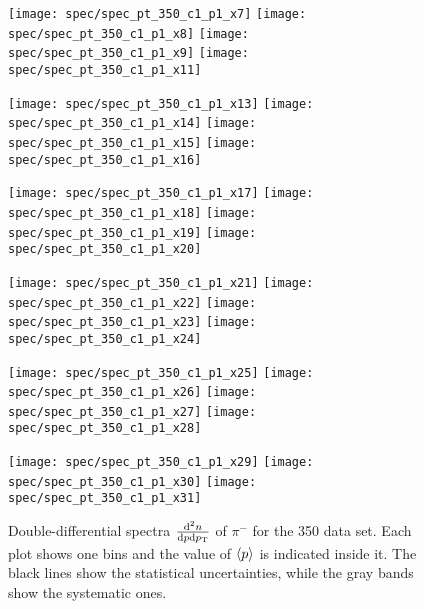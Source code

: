 \begin{figure}[!ht]
  \centering

  \texttt{[image: spec/spec\_pt\_350\_c1\_p1\_x7]}
  \texttt{[image: spec/spec\_pt\_350\_c1\_p1\_x8]}
  \texttt{[image: spec/spec\_pt\_350\_c1\_p1\_x9]}
  \texttt{[image: spec/spec\_pt\_350\_c1\_p1\_x11]}

  \texttt{[image: spec/spec\_pt\_350\_c1\_p1\_x13]}
  \texttt{[image: spec/spec\_pt\_350\_c1\_p1\_x14]}
  \texttt{[image: spec/spec\_pt\_350\_c1\_p1\_x15]}
  \texttt{[image: spec/spec\_pt\_350\_c1\_p1\_x16]}

  \texttt{[image: spec/spec\_pt\_350\_c1\_p1\_x17]}
  \texttt{[image: spec/spec\_pt\_350\_c1\_p1\_x18]}
  \texttt{[image: spec/spec\_pt\_350\_c1\_p1\_x19]}
  \texttt{[image: spec/spec\_pt\_350\_c1\_p1\_x20]}

  \texttt{[image: spec/spec\_pt\_350\_c1\_p1\_x21]}
  \texttt{[image: spec/spec\_pt\_350\_c1\_p1\_x22]}
  \texttt{[image: spec/spec\_pt\_350\_c1\_p1\_x23]}
  \texttt{[image: spec/spec\_pt\_350\_c1\_p1\_x24]}

  \texttt{[image: spec/spec\_pt\_350\_c1\_p1\_x25]}
  \texttt{[image: spec/spec\_pt\_350\_c1\_p1\_x26]}
  \texttt{[image: spec/spec\_pt\_350\_c1\_p1\_x27]}
  \texttt{[image: spec/spec\_pt\_350\_c1\_p1\_x28]}

  \texttt{[image: spec/spec\_pt\_350\_c1\_p1\_x29]}
  \texttt{[image: spec/spec\_pt\_350\_c1\_p1\_x30]}
  \texttt{[image: spec/spec\_pt\_350\_c1\_p1\_x31]}

  \caption{Double-differential spectra $\frac{\text{d}^2n}{\text{d}p\text{d}p_\text{T}}$
    of $\pi^-$ for the 350 \GeVc data set. Each plot shows one \pp bins and the value
    of $\langle p\rangle$ is indicated inside it. The black lines show the statistical
    uncertainties, while the gray bands show the systematic ones.}
  \label{fig:hadron:spec:dedx:all350:c1p1}
\end{figure}


